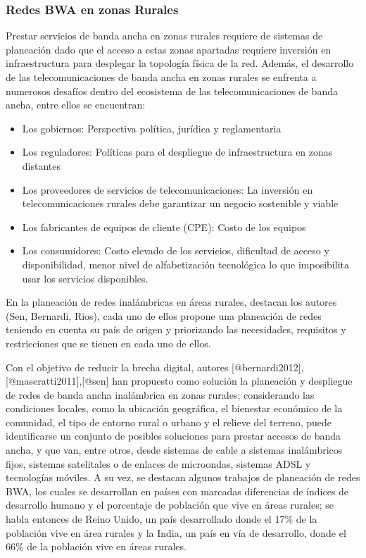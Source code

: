 \documentclass[]{article}
\begin{document}
\subsubsection{Redes BWA en zonas
Rurales}\label{redes-bwa-en-zonas-rurales}

Prestar servicios de banda ancha en zonas rurales requiere de sistemas
de planeación dado que el acceso a estas zonas apartadas requiere
inversión en infraestructura para desplegar la topología física de la
red. Además, el desarrollo de las telecomunicaciones de banda ancha en
zonas rurales se enfrenta a numerosos desafíos dentro del ecosistema de
las telecomunicaciones de banda ancha, entre ellos se encuentran:

\begin{itemize}
\item
  Los gobiernos: Perspectiva política, jurídica y reglamentaria
\item
  Los reguladores: Políticas para el despliegue de infraestructura en
  zonas distantes
\item
  Los proveedores de servicios de telecomunicaciones: La inversión en
  telecomunicaciones rurales debe garantizar un negocio sostenible y
  viable
\item
  Los fabricantes de equipos de cliente (CPE): Costo de los equipos
\item
  Los consumidores: Costo elevado de los servicios, dificultad de acceso
  y disponibilidad, menor nivel de alfabetización tecnológica lo que
  imposibilita usar los servicios disponibles.
\end{itemize}

En la planeación de redes inalámbricas en áreas rurales, destacan los
autores (Sen, Bernardi, Rios), cada uno de ellos propone una planeación
de redes teniendo en cuenta su país de origen y priorizando las
necesidades, requisitos y restricciones que se tienen en cada uno de
ellos.

Con el objetivo de reducir la brecha digital, autores
{[}@bernardi2012{]},{[}@maseratti2011{]},{[}@sen{]} han propuesto como
solución la planeación y despliegue de redes de banda ancha inalámbrica
en zonas rurales; considerando las condiciones locales, como la
ubicación geográfica, el bienestar económico de la comunidad, el tipo de
entorno rural o urbano y el relieve del terreno, puede identificarse un
conjunto de posibles soluciones para prestar accesos de banda ancha, y
que van, entre otros, desde sistemas de cable a sistemas inalámbricos
fijos, sistemas satelitales o de enlaces de microondas, sistemas ADSL y
tecnologías móviles. A su vez, se destacan algunos trabajos de
planeación de redes BWA, los cuales se desarrollan en países con
marcadas diferencias de índices de desarrollo humano y el porcentaje de
población que vive en áreas rurales; se habla entonces de Reino Unido,
un país desarrollado donde el 17\% de la población vive en área rurales
y la India, un país en vía de desarrollo, donde el 66\% de la población
vive en áreas rurales.
\end{document}
